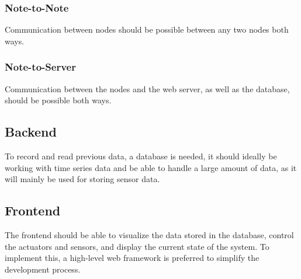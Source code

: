             \subsubsection{Note-to-Note}
            Communication between nodes should be possible between any two nodes
            both ways.

            \subsubsection{Note-to-Server}
            Communication between the nodes and the web server, as well as the 
            database, should be possible both ways.

        \subsection{Backend}
        To record and read previous data, a database is needed, it should ideally be 
        working with time series data and be able to handle a large amount of data, 
        as it will mainly be used for storing sensor data.

        \subsection{Frontend}
        The frontend should be able to visualize the data stored in the database,
        control the actuators and sensors, and display the current state of the 
        system. To implement this, a high-level web framework is preferred to 
        simplify the development process. 